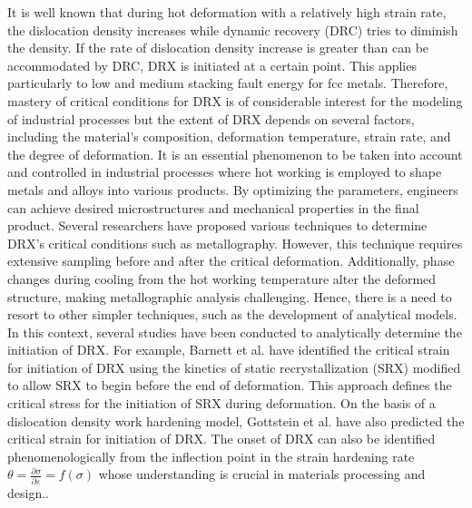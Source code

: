 \documentclass[metals,article,submit,pdftex,moreauthors]{Definitions/mdpi}
\makeatletter
\DeclareRobustCommand{\eal}{et al.\@\xspace}
\makeatother
\begin{document}
It is well known that during hot deformation with a relatively high strain rate, the dislocation density increases while dynamic recovery (DRC) tries to diminish the density. If the rate of dislocation density increase is greater than can be accommodated by DRC, DRX is initiated at a certain point. This applies particularly to low and medium stacking fault energy for fcc metals. Therefore, mastery of critical conditions for DRX is of considerable interest for the modeling of industrial processes but the extent of DRX depends on several factors, including the material's composition, deformation temperature, strain rate, and the degree of deformation. It is an essential phenomenon to be taken into account and controlled in industrial processes where hot working is employed to shape metals and alloys into various products. By optimizing the parameters, engineers can achieve desired microstructures and mechanical properties in the final product. Several researchers have proposed various techniques to determine DRX's critical conditions such as metallography. However, this technique requires extensive sampling before and after the critical deformation. Additionally, phase changes during cooling from the hot working temperature alter the deformed structure, making metallographic analysis challenging. Hence, there is a need to resort to other simpler techniques, such as the development of analytical models. In this context, several studies have been conducted to analytically determine the initiation of DRX. For example, Barnett \eal \cite{barnett2000predicting} have identified the critical strain for initiation of DRX using the kinetics of static recrystallization (SRX) modified to allow SRX to begin before the end of deformation. This approach defines the critical stress for the initiation of SRX during deformation. On the basis of a dislocation density work hardening model, Gottstein \eal \cite{gottstein2004prediction} have also predicted the critical strain for initiation of DRX. The onset of DRX can also be identified phenomenologically from the inflection point in the strain hardening rate $\theta=\frac{\partial \sigma}{\partial \varepsilon} = f(\sigma)$ whose understanding is crucial in materials processing and design.. 
\end{document}
